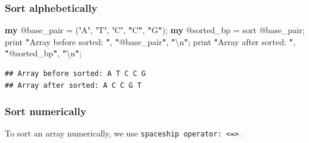 \documentclass[]{book}
\makeatletter
\newenvironment{Shaded}{\begin{snugshade}}{\end{snugshade}}
\newcommand{\CharTok}[1]{\textcolor[rgb]{0.31,0.60,0.02}{#1}}
\newcommand{\DataTypeTok}[1]{\textcolor[rgb]{0.13,0.29,0.53}{#1}}
\newcommand{\DecValTok}[1]{\textcolor[rgb]{0.00,0.00,0.81}{#1}}
\newcommand{\FunctionTok}[1]{\textcolor[rgb]{0.00,0.00,0.00}{#1}}
\newcommand{\KeywordTok}[1]{\textcolor[rgb]{0.13,0.29,0.53}{\textbf{#1}}}
\newcommand{\NormalTok}[1]{#1}
\newcommand{\StringTok}[1]{\textcolor[rgb]{0.31,0.60,0.02}{#1}}
\newenvironment{kframe}{%
\medskip{}
\setlength{\fboxsep}{.8em}
 \def\at@end@of@kframe{}%
 \ifinner\ifhmode%
  \def\at@end@of@kframe{\end{minipage}}%
  \begin{minipage}{\columnwidth}%
 \fi\fi%
 \def\FrameCommand##1{\hskip\@totalleftmargin \hskip-\fboxsep
 \colorbox{shadecolor}{##1}\hskip-\fboxsep
     \hskip-\linewidth \hskip-\@totalleftmargin \hskip\columnwidth}%
 \MakeFramed {\advance\hsize-\width
   \@totalleftmargin\z@ \linewidth\hsize
   \@setminipage}}%
 {\par\unskip\endMakeFramed%
 \at@end@of@kframe}
\renewenvironment{Shaded}{\begin{kframe}}{\end{kframe}}
\makeatother
\begin{document}
\hypertarget{sort-alphebetically}{%
\subsubsection{Sort alphebetically}\label{sort-alphebetically}}

\begin{Shaded}
\begin{Highlighting}[]
\KeywordTok{my} \DataTypeTok{@base_pair}\NormalTok{ = (}\KeywordTok{'}\StringTok{A}\KeywordTok{'}\NormalTok{, }\KeywordTok{'}\StringTok{T}\KeywordTok{'}\NormalTok{, }\KeywordTok{'}\StringTok{C}\KeywordTok{'}\NormalTok{, }\KeywordTok{"}\StringTok{C}\KeywordTok{"}\NormalTok{, }\KeywordTok{"}\StringTok{G}\KeywordTok{"}\NormalTok{);}
\KeywordTok{my} \DataTypeTok{@sorted_bp}\NormalTok{ = }\FunctionTok{sort} \DataTypeTok{@base_pair}\NormalTok{;}
\FunctionTok{print} \KeywordTok{"}\StringTok{Array before sorted: }\KeywordTok{"}\NormalTok{, }\KeywordTok{"}\DataTypeTok{@base_pair}\KeywordTok{"}\NormalTok{, }\KeywordTok{"}\CharTok{\textbackslash{}n}\KeywordTok{"}\NormalTok{;}
\FunctionTok{print} \KeywordTok{"}\StringTok{Array after sorted: }\KeywordTok{"}\NormalTok{, }\KeywordTok{"}\DataTypeTok{@sorted_bp}\KeywordTok{"}\NormalTok{, }\KeywordTok{"}\CharTok{\textbackslash{}n}\KeywordTok{"}\NormalTok{;}
\end{Highlighting}
\end{Shaded}

\begin{verbatim}
## Array before sorted: A T C C G
## Array after sorted: A C C G T
\end{verbatim}

\hypertarget{sort-numerically}{%
\subsubsection{Sort numerically}\label{sort-numerically}}

To sort an array numerically, we use \texttt{spaceship\ operator:\ \textless{}=\textgreater{}}.

\begin{Shaded}
\end{Shaded}
\end{document}
